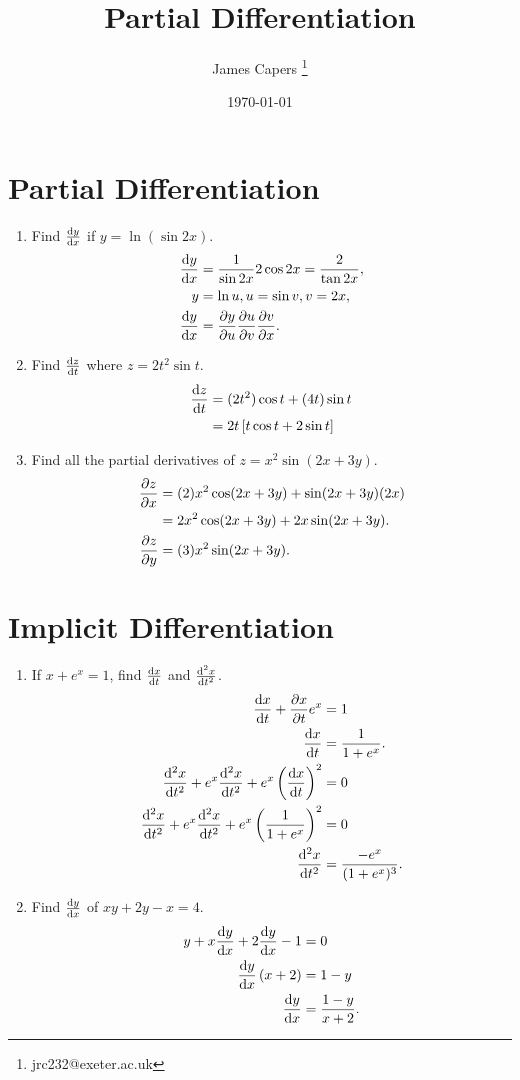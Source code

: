 \documentclass{article}
\title{Partial Differentiation}
\author{James Capers \thanks{jrc232@exeter.ac.uk}}
\date{\today}
\begin{document}
\maketitle

\section{Partial Differentiation}

\begin{enumerate}
	\item{Find $\dv{y}{x}$ if $y = \ln (\sin 2x)$.
		\begin{align*}
			\dv{y}{x} &= \frac{1}{\sin 2x} 2 \cos 2x = \frac{2}{\tan 2x}, \\
			y &= \ln u, u = \sin v, v = 2x,\\
			\dv{y}{x} &= \pdv{y}{u} \pdv{u}{v} \pdv{v}{x} .
		\end{align*}			
	}
	\item{Find $\dv{z}{t}$ where $z = 2 t^2 \sin t$.
		\begin{align*}
			\dv{z}{t} &= (2t^2) \cos t + (4t) \sin t \\
			&= 2t \left[ t \cos t + 2 \sin t \right]
		\end{align*}
	}
	\item{Find all the partial derivatives of $z = x^2 \sin (2x + 3y)$.
		\begin{align*}
			\pdv{z}{x} &= (2) x^2 \cos (2x + 3y) + \sin (2x + 3y) (2x) \\
			&= 2x^2 \cos (2x + 3y) + 2x \sin (2x + 3y). \\
			\pdv{z}{y} &= (3) x^2 \sin (2x + 3y) .
		\end{align*}			
	}
\end{enumerate}

\section{Implicit Differentiation}

\begin{enumerate}
	\item{If $x + e^x = 1$, find $\dv{x}{t}$ and $\dv[2]{x}{t}$.
		\begin{align*}
			\dv{x}{t} + \pdv{x}{t} e^x &= 1 \\
			\dv{x}{t} &= \frac{1}{1 + e^x} . \\
			\dv[2]{x}{t} + e^x \dv[2]{x}{t} + e^x \left( \dv{x}{t} \right)^2  &= 0 \\
			\dv[2]{x}{t} + e^x \dv[2]{x}{t} + e^x \left( \frac{1}{1 + e^x} \right)^2  &= 0\\
			\dv[2]{x}{t} &= \frac{-e^x}{(1+e^x)^3} .
		\end{align*}			
	}
	\item{Find $\dv{y}{x}$ of $xy + 2y - x = 4$.
		\begin{align*}
				y + x \dv{y}{x} + 2 \dv{y}{x} - 1 &= 0 \\
				\dv{y}{x} \left( x + 2 \right) &= 1 - y \\
				\dv{y}{x} &= \frac{1-y}{x+2}. 
		\end{align*}			
	}
\end{enumerate}
\end{document}
